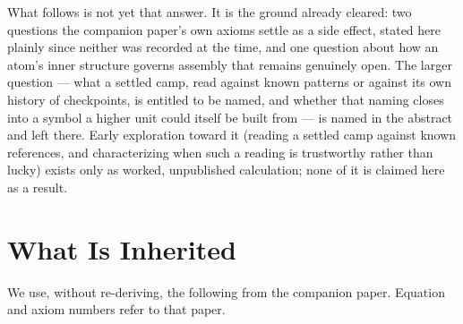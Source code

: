 \documentclass[12pt, a4paper]{article}
\begin{document}
What follows is not yet that answer. It is the ground already
cleared: two questions the companion paper's own axioms settle as a
side effect, stated here plainly since neither was recorded at the
time, and one question about how an atom's inner structure governs
assembly that remains genuinely open. The larger question --- what a
settled camp, read against known patterns or against its own
history of checkpoints, is entitled to be named, and whether that
naming closes into a symbol a higher unit could itself be built
from --- is named in the abstract and left there. Early exploration
toward it (reading a settled camp against known references, and
characterizing when such a reading is trustworthy rather than
lucky) exists only as worked, unpublished calculation; none of it is
claimed here as a result.

\section{What Is Inherited}
\label{sec:inherited}

We use, without re-deriving, the following from the companion
paper. Equation and axiom numbers refer to that paper.
\end{document}
